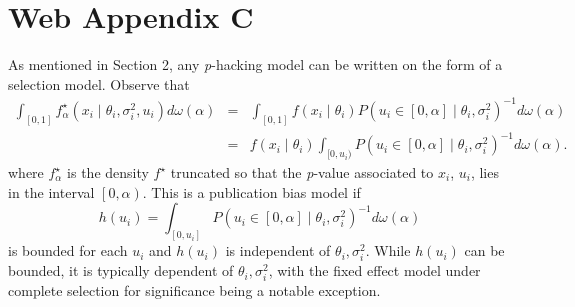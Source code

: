 \section*{Web Appendix C}

As mentioned in Section 2, any \textit{p}-hacking model can be written on the form of a selection model. Observe that
\begin{eqnarray*}
\int_{[0,1]}f_\alpha^{\star}(x_{i}\mid\theta_{i},\sigma^2_{i}, u_i)d\omega(\alpha) & = & \int_{[0,1]}f(x_{i}\mid\theta_{i})P(u_i\in\left[0,\alpha\right]\mid\theta_{i},\sigma^2_{i})^{-1}d\omega(\alpha)\\
 & = & f(x_{i}\mid\theta_{i})\int_{[0,u_i)}P(u_i\in\left[0,\alpha\right]\mid\theta_{i},\sigma^2_{i})^{-1}d\omega(\alpha).
\end{eqnarray*}
where $f_\alpha^{\star}$ is the density $f^{\star}$ truncated so that the \textit{p}-value associated to $x_i$, $u_i$, lies in the interval $\left[0,\alpha\right)$. This is a publication bias model if $$h(u_i)=\int_{[0,u_i]}P(u_i\in\left[0,\alpha\right]\mid\theta_{i},\sigma^2_{i})^{-1}d\omega(\alpha)$$ is bounded for each $u_i$ and $h(u_i)$ is independent of $\theta_{i},\sigma^2_{i}$. While $h(u_i)$ can be bounded, it is typically dependent of $\theta_{i},\sigma^2_{i}$, with the fixed effect model under complete selection for significance being a notable exception.

